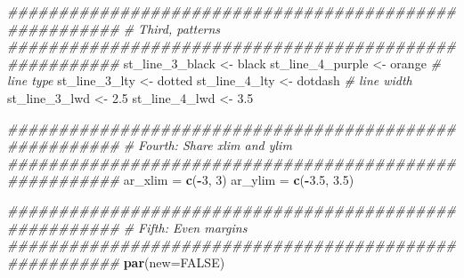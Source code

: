 \documentclass[
]{book}
\newenvironment{Shaded}{\begin{snugshade}}{\end{snugshade}}
\newcommand{\CommentTok}[1]{\textcolor[rgb]{0.56,0.35,0.01}{\textit{#1}}}
\newcommand{\DataTypeTok}[1]{\textcolor[rgb]{0.13,0.29,0.53}{#1}}
\newcommand{\DecValTok}[1]{\textcolor[rgb]{0.00,0.00,0.81}{#1}}
\newcommand{\FloatTok}[1]{\textcolor[rgb]{0.00,0.00,0.81}{#1}}
\newcommand{\KeywordTok}[1]{\textcolor[rgb]{0.13,0.29,0.53}{\textbf{#1}}}
\newcommand{\NormalTok}[1]{#1}
\newcommand{\OperatorTok}[1]{\textcolor[rgb]{0.81,0.36,0.00}{\textbf{#1}}}
\newcommand{\OtherTok}[1]{\textcolor[rgb]{0.56,0.35,0.01}{#1}}
\newcommand{\StringTok}[1]{\textcolor[rgb]{0.31,0.60,0.02}{#1}}
\begin{document}
\begin{Shaded}
\begin{Highlighting}[]
\CommentTok{\#\#\#\#\#\#\#\#\#\#\#\#\#\#\#\#\#\#\#\#\#\#\#\#\#\#\#\#\#\#\#\#\#\#\#\#\#\#\#\#\#\#\#\#\#\#\#\#\#\#\#\#\#\#\#}
\CommentTok{\# Third, patterns}
\CommentTok{\#\#\#\#\#\#\#\#\#\#\#\#\#\#\#\#\#\#\#\#\#\#\#\#\#\#\#\#\#\#\#\#\#\#\#\#\#\#\#\#\#\#\#\#\#\#\#\#\#\#\#\#\#\#\#}
\NormalTok{st\_line\_}\DecValTok{3}\NormalTok{\_black \textless{}{-}}\StringTok{ \textquotesingle{}black\textquotesingle{}}
\NormalTok{st\_line\_}\DecValTok{4}\NormalTok{\_purple \textless{}{-}}\StringTok{ \textquotesingle{}orange\textquotesingle{}}
\CommentTok{\# line type}
\NormalTok{st\_line\_}\DecValTok{3}\NormalTok{\_lty \textless{}{-}}\StringTok{ \textquotesingle{}dotted\textquotesingle{}}
\NormalTok{st\_line\_}\DecValTok{4}\NormalTok{\_lty \textless{}{-}}\StringTok{ \textquotesingle{}dotdash\textquotesingle{}}
\CommentTok{\# line width}
\NormalTok{st\_line\_}\DecValTok{3}\NormalTok{\_lwd \textless{}{-}}\StringTok{ }\FloatTok{2.5}
\NormalTok{st\_line\_}\DecValTok{4}\NormalTok{\_lwd \textless{}{-}}\StringTok{ }\FloatTok{3.5}

\CommentTok{\#\#\#\#\#\#\#\#\#\#\#\#\#\#\#\#\#\#\#\#\#\#\#\#\#\#\#\#\#\#\#\#\#\#\#\#\#\#\#\#\#\#\#\#\#\#\#\#\#\#\#\#\#\#\#}
\CommentTok{\# Fourth: Share xlim and ylim}
\CommentTok{\#\#\#\#\#\#\#\#\#\#\#\#\#\#\#\#\#\#\#\#\#\#\#\#\#\#\#\#\#\#\#\#\#\#\#\#\#\#\#\#\#\#\#\#\#\#\#\#\#\#\#\#\#\#\#}
\NormalTok{ar\_xlim =}\StringTok{ }\KeywordTok{c}\NormalTok{(}\OperatorTok{{-}}\DecValTok{3}\NormalTok{, }\DecValTok{3}\NormalTok{)}
\NormalTok{ar\_ylim =}\StringTok{ }\KeywordTok{c}\NormalTok{(}\OperatorTok{{-}}\FloatTok{3.5}\NormalTok{, }\FloatTok{3.5}\NormalTok{)}

\CommentTok{\#\#\#\#\#\#\#\#\#\#\#\#\#\#\#\#\#\#\#\#\#\#\#\#\#\#\#\#\#\#\#\#\#\#\#\#\#\#\#\#\#\#\#\#\#\#\#\#\#\#\#\#\#\#\#}
\CommentTok{\# Fifth: Even margins}
\CommentTok{\#\#\#\#\#\#\#\#\#\#\#\#\#\#\#\#\#\#\#\#\#\#\#\#\#\#\#\#\#\#\#\#\#\#\#\#\#\#\#\#\#\#\#\#\#\#\#\#\#\#\#\#\#\#\#}
\KeywordTok{par}\NormalTok{(}\DataTypeTok{new=}\OtherTok{FALSE}\NormalTok{)}


\end{Highlighting}
\end{Shaded}
\end{document}
